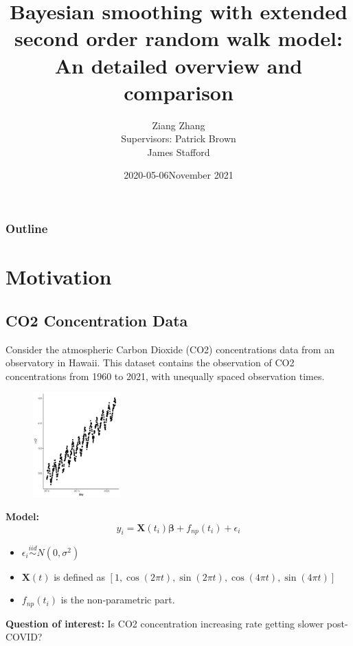 \documentclass{beamer} %
\title{\textbf{Bayesian smoothing with extended second order random walk model: An detailed overview and comparison}}
\author{Ziang Zhang\\[5mm]{\small Supervisors: Patrick Brown \\ \hspace{18mm} James Stafford}}
\institute{Department of Statistics, University of Toronto}
\date{2020-05-06}
\date{November 2021}
\begin{document}
\begin{frame}
\titlepage
\end{frame}

\begin{frame}
\frametitle{Outline}
\tableofcontents
\end{frame}

\section{Motivation}

\subsection{CO2 Concentration Data}
\begin{frame}
Consider the atmospheric Carbon Dioxide (CO2) concentrations data from an observatory in Hawaii. This dataset contains the observation of CO2 concentrations from 1960 to 2021, with unequally spaced observation times. 

\begin{figure}[p]
      \includegraphics[width=0.3\textwidth]{co2_original_plot.pdf}
    \label{fig:co2_1}
\end{figure}
\end{frame}


\begin{frame}
\textbf{Model:} 
\pause
$$y_i = \boldsymbol{X}(t_i) \boldsymbol{\beta} + f_{np}(t_i) + \epsilon_i$$

\begin{itemize}
\pause
\item  $\epsilon_i \overset{iid}\sim N(0,\sigma^2)$
\pause
\item $\boldsymbol{X}(t)$ is defined as  
$[1, \cos(2 \pi t), \sin(2 \pi t), \cos(4 \pi t), \sin(4 \pi t)]$
\pause
\item $f_{np}(t_i)$ is the non-parametric part.
\end{itemize}

\pause
\textbf{Question of interest:} Is CO2 concentration increasing rate getting slower post-COVID?
\end{frame}
\end{document}
